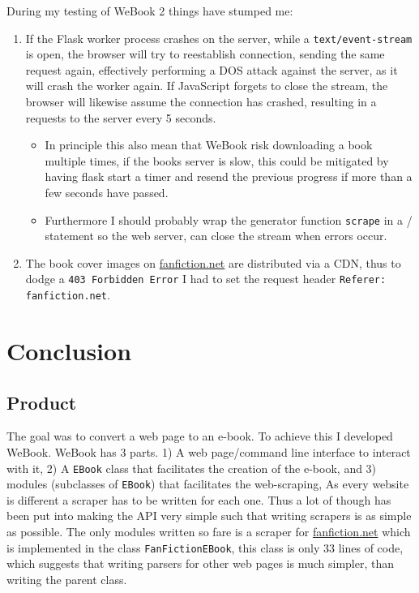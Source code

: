 \documentclass[]{report}   %
\begin{document}
During my testing of WeBook 2 things have stumped me:
\begin{enumerate}
    \item If the Flask worker process crashes on the server, while a
        \texttt{text/event-stream} is open, the browser will try to reestablish
        connection, sending the same request again, effectively performing a
        DOS attack against the server, as it will crash the worker again. If
        JavaScript forgets to close the stream, the browser will likewise
        assume the connection has crashed, resulting in a requests to the server
        every 5 seconds. 
    \begin{itemize}
            \item In principle this also mean that WeBook risk downloading a book
                multiple times, if the books server is slow, this could be
                mitigated by having flask start a timer and resend the previous
                progress if more than a few seconds have passed. 
            \item Furthermore I should probably wrap the generator function
                \texttt{scrape} in a / statement so the
                web server, can close the stream when errors occur. 
    \end{itemize}
    \item The book cover images on \url{fanfiction.net} are distributed via a
        CDN, thus to dodge a \texttt{403 Forbidden Error} I had to set the
        request header \texttt{Referer: fanfiction.net}.
\end{enumerate}


\chapter{Conclusion}
\section{Product}
The goal was to convert a web page to an e-book. To achieve this I developed
WeBook. WeBook has 3 parts. 1) A web page/command line interface to interact
with it, 2) A \texttt{EBook} class that facilitates the creation of the e-book,
and 3) modules (subclasses of \texttt{EBook}) that facilitates the web-scraping,
As every website is different a scraper has to be written for each one. Thus a
lot of though has been put into making the API very simple such that writing
scrapers is as simple as possible. The only modules written so fare is a scraper
for \url{fanfiction.net} which is implemented in the class
\texttt{FanFictionEBook}, this class is only 33 lines of code, which suggests
that writing parsers for other web pages is much simpler, than writing the
parent class.
\end{document}
